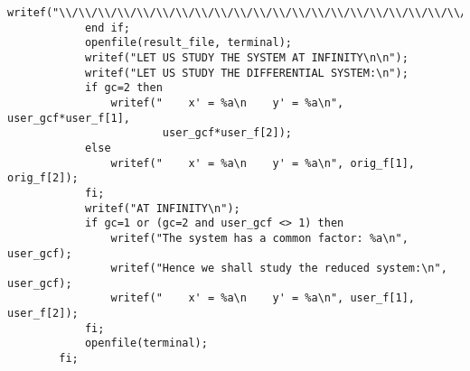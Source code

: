 \documentclass[a4paper,10pt]{article}
\begin{document}
\begin{lstlisting}[name=main]
                writef("\\/\\/\\/\\/\\/\\/\\/\\/\\/\\/\\/\\/\\/\\/\\/\\/\\/\\/\\/\\/\\/\\/\\/\\/\\/\\/\\/\\/\\/\\/\\/\\/\\/\\/\\/\\/\\/\\/\\/\\/\n\n");
            end if;
            openfile(result_file, terminal);
            writef("LET US STUDY THE SYSTEM AT INFINITY\n\n");
            writef("LET US STUDY THE DIFFERENTIAL SYSTEM:\n");
            if gc=2 then
                writef("    x' = %a\n    y' = %a\n", user_gcf*user_f[1],
                        user_gcf*user_f[2]);
            else
                writef("    x' = %a\n    y' = %a\n", orig_f[1], orig_f[2]);
            fi;
            writef("AT INFINITY\n");
            if gc=1 or (gc=2 and user_gcf <> 1) then
                writef("The system has a common factor: %a\n", user_gcf);
                writef("Hence we shall study the reduced system:\n", user_gcf);
                writef("    x' = %a\n    y' = %a\n", user_f[1], user_f[2]);
            fi;
            openfile(terminal);
        fi;


\end{lstlisting}
\end{document}
